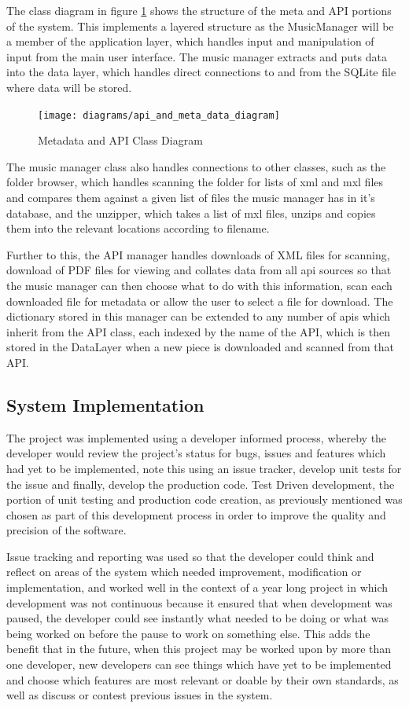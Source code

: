The class diagram in figure \ref{fig:metadiagram} shows the structure of the meta and API portions of the system. This implements a layered structure as the MusicManager will be a member of the application layer, which handles input and manipulation of input from the main user interface. The music manager extracts and puts data into the data layer, which handles direct connections to and from the SQLite file where data will be stored.
\begin{figure}[H]
    \centering
    \texttt{[image: diagrams/api\_and\_meta\_data\_diagram]}
    \caption{Metadata and API Class Diagram}
    \label{fig:metadiagram}
\end{figure}
The music manager class also handles connections to other classes, such as the folder browser, which handles scanning the folder for lists of xml and mxl files and compares them against a given list of files the music manager has in it's database, and the unzipper, which takes a list of mxl files, unzips and copies them into the relevant locations according to filename. 

Further to this, the API manager handles downloads of XML files for scanning, download of PDF files for viewing and collates data from all api sources so that the music manager can then choose what to do with this information, scan each downloaded file for metadata or allow the user to select a file for download. The dictionary stored in this manager can be extended to any number of apis which inherit from the API class, each indexed by the name of the API, which is then stored in the DataLayer when a new piece is downloaded and scanned from that API.


\subsection{System Implementation}
The project was implemented using a developer informed process, whereby the developer would review the project's status for bugs, issues and features which had yet to be implemented, note this using an issue tracker, develop unit tests for the issue and finally, develop the production code. Test Driven development, the portion of unit testing and production code creation, as previously mentioned was chosen as part of this development process in order to improve the quality and precision of the software. 


Issue tracking and reporting was used so that the developer could think and reflect on areas of the system which needed improvement, modification or implementation, and worked well in the context of a year long project in which development was not continuous because it ensured that when development was paused, the developer could see instantly what needed to be doing or what was being worked on before the pause to work on something else. This adds the benefit that in the future, when this project may be worked upon by more than one developer, new developers can see things which have yet to be implemented and choose which features are most relevant or doable by their own standards, as well as discuss or contest previous issues in the system.


